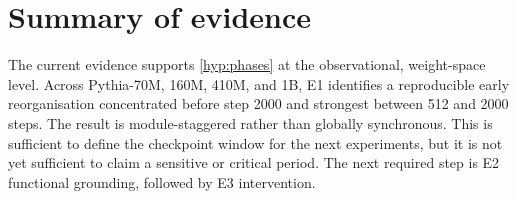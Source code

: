 
\section{Summary of evidence}
\label{sec:res-summary}

The current evidence supports \cref{hyp:phases} at the observational, weight-space level. Across
Pythia-70M, 160M, 410M, and 1B, E1 identifies a reproducible early reorganisation concentrated
before step 2000 and strongest between 512 and 2000 steps. The result is module-staggered rather
than globally synchronous. This is sufficient to define the checkpoint window for the next
experiments, but it is not yet sufficient to claim a sensitive or critical period. The next required
step is E2 functional grounding, followed by E3 intervention.
